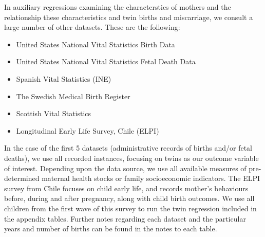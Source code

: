 \documentclass[subeqn]{article}
\begin{document}
\begin{spacing}{1.4}
In auxiliary regressions examining the characterstics of mothers and the 
relationship these characteristics and twin births and miscarriage, we consult
a large number of other datasets.  These are the following:
\begin{itemize}
\item United States National Vital Statistics Birth Data
\item United States National Vital Statistics Fetal Death Data
\item Spanish Vital Statistics (INE)
\item The Swedish Medical Birth Register
\item Scottish Vital Statistics
\item Longitudinal Early Life Survey, Chile (ELPI) 
\end{itemize}

In the case of the first 5 datasets (administrative records of births and/or 
fetal deaths), we use all recorded instances, focusing on twins as our 
outcome variable of interest.  Depending upon the data source, we use all
available measures of pre-determined maternal health stocks or family 
socioeconomic indicators.  The ELPI survey from Chile focuses on child early
life, and records mother's behaviours before, during and after pregnancy,
along with child birth outcomes.  We use all children from the first wave of
this survey to run the twin regression included in the appendix tables.  
Further notes regarding each dataset and the particular years and number of
births can be found in the notes to each table.


\end{spacing}
\end{document}
